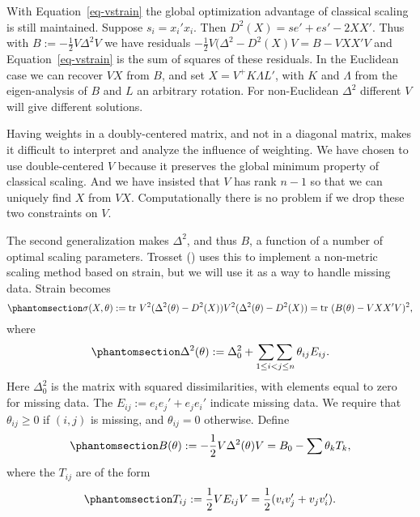 \documentclass[
  12pt,
  letterpaper,
  DIV=11,
  numbers=noendperiod]{scrartcl}
\begin{document}
With Equation~\ref{eq-vstrain} the global optimization advantage of
classical scaling is still maintained. Suppose \(s_i=x_i'x_i\). Then
\(D^2(X)=se'+es'-2XX'\). Thus with \(B:=-\frac12V\Delta^2V\) we have
residuals \(-\frac12V(\Delta^2-D^2(X)V=B-VXX'V\) and
Equation~\ref{eq-vstrain} is the sum of squares of these residuals. In
the Euclidean case we can recover \(VX\) from \(B\), and set
\(X=V^+K\Lambda L'\), with \(K\) and \(\Lambda\) from the eigen-analysis
of \(B\) and \(L\) an arbitrary rotation. For non-Euclidean \(\Delta^2\)
different \(V\) will give different solutions.

Having weights in a doubly-centered matrix, and not in a diagonal
matrix, makes it difficult to interpret and analyze the influence of
weighting. We have chosen to use double-centered \(V\) because it
preserves the global minimum property of classical scaling. And we have
insisted that \(V\) has rank \(n-1\) so that we can uniquely find \(X\)
from \(VX\). Computationally there is no problem if we drop these two
constraints on \(V\).

The second generalization makes \(\Delta^2\), and thus \(B\), a function
of a number of optimal scaling parameters. Trosset
() uses this to implement a non-metric
scaling method based on strain, but we will use it as a way to handle
missing data. Strain becomes
\begin{equation}\phantomsection\label{eq-strainmissing}{
\sigma(X,\theta):=\text{tr}\ V^2(\Delta^2(\theta)-D^2(X))V^2(\Delta^2(\theta)-D^2(X))=\text{tr}\ (B(\theta)-VXX'V)^2,
}\end{equation} where
\begin{equation}\phantomsection\label{eq-deltatheta}{
\Delta^2(\theta):=\Delta^2_0+\mathop{\sum\sum}_{1\leq i<j\leq n}\theta_{ij}E_{ij}.
}\end{equation} Here \(\Delta_0^2\) is the matrix with squared
dissimilarities, with elements equal to zero for missing data. The
\(E_{ij}:=e_ie_j'+e_je_i'\) indicate missing data. We require that
\(\theta_{ij}\geq 0\) if \((i,j)\) is missing, and \(\theta_{ij}=0\)
otherwise. Define \begin{equation}\phantomsection\label{eq-btheta}{
B(\theta):=-\frac12V\Delta^2(\theta)V=B_0-\sum \theta_kT_k,
}\end{equation} where the \(T_{ij}\) are of the form
\begin{equation}\phantomsection\label{eq-tmatdef}{
T_{ij}:=\frac12VE_{ij}V=\frac12(v_iv_j'+v_jv_i').
}\end{equation}
\end{document}
